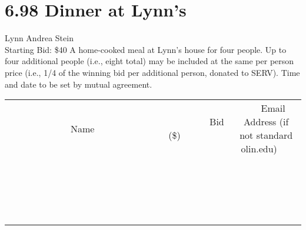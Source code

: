 \documentclass[11pt]{article}
\begin{document}
\section*{6.98 Dinner at Lynn's}
Lynn Andrea Stein
\\
Starting Bid: \$40
\newline
A home-cooked meal at Lynn's house for four people.  Up to four additional people (i.e., eight total) may be included at the same per person price (i.e., 1/4 of the winning bid per additional person, donated to SERV).  Time and date to be set by mutual agreement.
\\[3ex]
\begin{tabular}{c c c}
~~~~~~~~~~~~~Name~~~~~~~~~~~~~ & ~~~~~~~~~Bid (\$)~~~~~~~~~  & ~~~Email Address (if not standard olin.edu)~~~\\
 & & \\
\hline
 & & \\
\hline
 & & \\
\hline
 & & \\
\hline
 & & \\
\hline
 & & \\
\hline
 & & \\
\hline
 & & \\
\hline
 & & \\
\hline
 & & \\
\hline
 & & \\
\hline
 & & \\
\hline
 & & \\
\hline
 & & \\
\hline
 & & \\
\hline
 & & \\
\hline
 & & \\
\hline
 & & \\
\hline
 & & \\
\hline
\end{tabular}
\newpage
\end{document}
